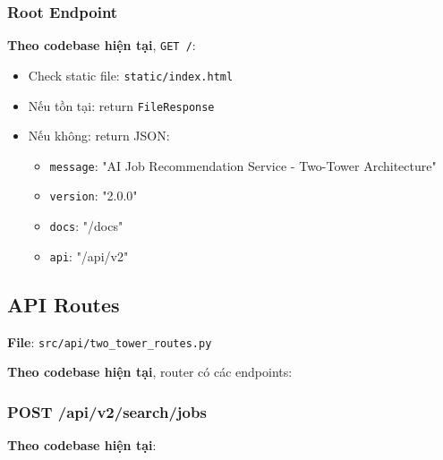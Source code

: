 \subsubsection{Root Endpoint}

\textbf{Theo codebase hiện tại}, \texttt{GET /}:

\begin{itemize}
    \item Check static file: \texttt{static/index.html}
    \item Nếu tồn tại: return \texttt{FileResponse}
    \item Nếu không: return JSON:
    \begin{itemize}
        \item \texttt{message}: "AI Job Recommendation Service - Two-Tower Architecture"
        \item \texttt{version}: "2.0.0"
        \item \texttt{docs}: "/docs"
        \item \texttt{api}: "/api/v2"
    \end{itemize}
\end{itemize}

\subsection{API Routes}

\textbf{File}: \texttt{src/api/two\_tower\_routes.py}

\textbf{Theo codebase hiện tại}, router có các endpoints:

\subsubsection{POST /api/v2/search/jobs}

\textbf{Theo codebase hiện tại}:

